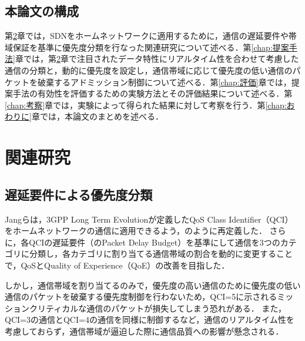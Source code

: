 \documentclass[a4paper,11pt,uplatex]{ujreport}
\begin{document}
\section{本論文の構成}
\label{sec:本論文の構成}

  第\ref{chap:関連研究}章では，SDNをホームネットワークに適用するために，通信の遅延要件や帯域保証を基準に優先度分類を行なった関連研究について述べる．第\ref{chap:提案手法}章では，第\ref{chap:関連研究}章で注目されたデータ特性にリアルタイム性を合わせて考慮した通信の分類と，動的に優先度を設定し，通信帯域に応じて優先度の低い通信のパケットを破棄するアドミッション制御について述べる．第\ref{chap:評価}章では，提案手法の有効性を評価するための実験方法とその評価結果について述べる．第\ref{chap:考察}章では，実験によって得られた結果に対して考察を行う．第\ref{chap:おわりに}章では，本論文のまとめを述べる．


\chapter{関連研究}
\label{chap:関連研究}

\section{遅延要件による優先度分類}
\label{sec:遅延要件による優先度分類}

  Jangらは，3GPP Long Term Evolutionが定義したQoS Class Identifier（QCI）をホームネットワークの通信に適用できるよう，のように再定義した\cite{Framework}．
  さらに，各QCIの遅延要件（のPacket Delay Budget）を基準にして通信を3つのカテゴリに分類し，各カテゴリに割り当てる通信帯域の割合を動的に変更することで，QoSとQuality of Experience（QoE）の改善を目指した\cite{Framework2}．\par
  しかし，通信帯域を割り当てるのみで，優先度の高い通信のために優先度の低い通信のパケットを破棄する優先度制御を行わないため，QCI=5に示されるミッションクリティカルな通信のパケットが損失してしまう恐れがある．
  また，QCI=3の通信とQCI=4の通信を同様に制御するなど，通信のリアルタイム性を考慮しておらず，通信帯域が逼迫した際に通信品質への影響が懸念される．
\end{document}

